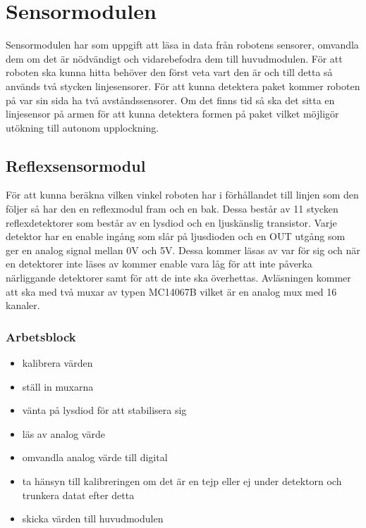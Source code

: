 %

\section{Sensormodulen}
Sensormodulen har som uppgift att läsa in data från robotens sensorer, omvandla dem om det är nödvändigt och vidarebefodra dem till huvudmodulen. För att roboten ska kunna hitta behöver den först veta vart den är och till detta så används två stycken linjesensorer. För att kunna detektera paket kommer roboten på var sin sida ha två avståndssensorer. Om det finns tid så ska det sitta en linjesensor på armen för att kunna detektera formen på paket vilket möjligör utökning till autonom upplockning.

\subsection{Reflexsensormodul}
För att kunna beräkna vilken vinkel roboten har i förhållandet till linjen som den följer så har den en reflexmodul fram och en bak. Dessa består av 11 stycken reflexdetektorer som består av en lysdiod och en ljuskänslig transistor. Varje detektor har en enable ingång som slår på ljusdioden och en OUT utgång som ger en analog signal mellan 0V och 5V. Dessa kommer läsas av var för sig och när en detektorer inte läses av kommer enable vara låg för att inte påverka närliggande detektorer samt för att de inte ska överhettas. Avläsningen kommer att ska med två muxar av typen MC14067B vilket är en analog mux med 16 kanaler.
\subsubsection{Arbetsblock}
\begin{itemize}
\item kalibrera värden
\item ställ in muxarna
\item vänta på lysdiod för att stabilisera sig
\item läs av analog värde
\item omvandla analog värde till digital
\item ta hänsyn till kalibreringen om det är en tejp eller ej under detektorn och trunkera datat efter detta
\item skicka värden till huvudmodulen
\end{itemize}
